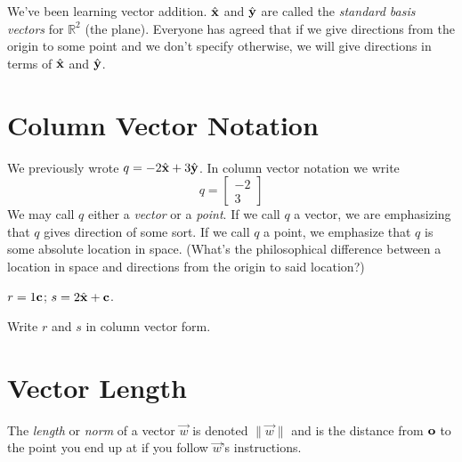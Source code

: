 \documentclass{article}
\newcommand{\xh}{\hat{\bf x}}
\newcommand{\yh}{\hat{\bf y}}
\newcommand{\R}{\mathbb{R}}
\begin{document}
	We've been learning vector addition. $\xh$ and $\yh$ are called the \emph{standard
	basis vectors} for $\R^2$ (the plane).  Everyone has agreed that if we give directions
	from the origin to some point and we don't specify otherwise, we will give directions
	in terms of $\xh$ and $\yh$.

\section*{Column Vector Notation}
	We previously wrote $q=-2\xh+3\yh$.  In column vector notation we write
	\[
		q=\begin{bmatrix}-2\\3\end{bmatrix}
	\]
	We may call $q$ either a \emph{vector} or a \emph{point}.  If we call $q$ a vector,
	we are emphasizing that $q$ gives direction of some sort.  If we call $q$ a point,
	we emphasize that $q$ is some absolute location in space. (What's the philosophical
	difference between a location in space and directions from the origin to said location?)

	$r=1\bf c$; $s=2\xh+\bf c$.
	\begin{Enum}
		\item Write $r$ and $s$ in column vector form.
	\end{Enum}

\section*{Vector Length}
	The \emph{length} or \emph{norm} of a vector $\vec w$ is denoted $\|\vec w\|$ and is the distance
	from $\bf o$ to the point you end up at if you follow $\vec w$'s instructions.
\end{document}
